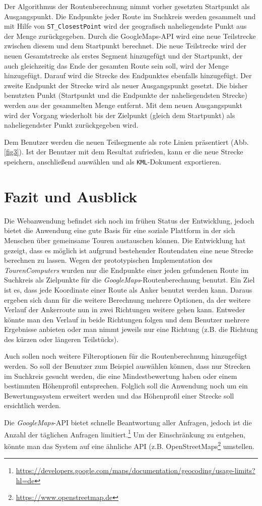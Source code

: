 \documentclass[a4paper,11pt,utf8]{scrartcl}
\begin{document}
Der Algorithmus der Routenberechnung nimmt vorher gesetzten Startpunkt als Ausgangspunkt. Die Endpunkte jeder Route im Suchkreis werden gesammelt und mit Hilfe von \texttt{ST\_ClosestPoint} wird der geografisch naheliegendste Punkt aus der Menge zurückgegeben. Durch die GoogleMaps-API wird eine neue Teilstrecke zwischen diesem und dem Startpunkt berechnet. Die neue Teilstrecke wird der neuen Gesamtstrecke als erstes Segment hinzugefügt und der Startpunkt, der auch gleichzeitig das Ende der gesamten Route sein soll, wird der Menge hinzugefügt. Darauf wird die Strecke des Endpunktes ebenfalls hinzugefügt. Der zweite Endpunkt der Strecke wird als neuer Ausgangspunkt gesetzt. Die bisher benutzten Punkt (Startpunkt und die Endpunkte der naheliegendsten Strecke) werden aus der gesammelten Menge entfernt. Mit dem neuen Ausgangspunkt wird der Vorgang wiederholt bis der Zielpunkt (gleich dem Startpunkt) als naheliegendster Punkt zurückgegeben wird.

Dem Benutzer werden die neuen Teilsegmente als rote Linien präsentiert (Abb. \ref{fig3}). Ist der Benutzer mit dem Resultat zufrieden, kann er die neue Strecke speichern, anschließend auswählen und als \texttt{KML}-Dokument exportieren.

\section{Fazit und Ausblick}
Die Webanwendung befindet sich noch im frühen Status der Entwicklung, jedoch bietet die Anwendung eine gute Basis für eine soziale Plattform in der sich Menschen über gemeinsame Touren austauschen können. Die Entwicklung hat gezeigt, dass es möglich ist aufgrund bestehender Routendaten eine neue Strecke berechnen zu lassen. Wegen der prototypischen Implementation des \textit{TourenComputers} wurden nur die Endpunkte einer jeden gefundenen Route im Suchkreis als Zielpunkte für die \textit{GoogleMaps}-Routenberechnung benutzt. Ein Ziel ist es, dass jede Koordinate einer Route als Anker benutzt werden kann. Daraus ergeben sich dann für die weitere Berechnung mehrere Optionen, da der weitere Verlauf der Ankerroute nun in zwei Richtungen weitere gehen kann. Entweder könnte man den Verlauf in beide Richtungen folgen und dem Benutzer mehrere Ergebnisse anbieten oder man nimmt jeweils nur eine Richtung (z.B. die Richtung des kürzen oder längeren Teilstücks).

Auch sollen noch weitere Filteroptionen für die Routenberechnung hinzugefügt werden. So soll der Benutzer zum Beispiel auswählen können, dass nur Strecken im Suchkreis gesucht werden, die eine Mindestbewertung haben oder einem bestimmten Höhenprofil entsprechen. Folglich soll die Anwendung noch um ein Bewertungssystem erweitert werden und das Höhenprofil einer Strecke soll ersichtlich werden.

Die \textit{GoogleMaps}-API bietet schnelle Beantwortung aller Anfragen, jedoch ist die Anzahl der täglichen Anfragen limitiert.\footnote{\url{https://developers.google.com/maps/documentation/geocoding/usage-limits?hl=de}} Um der Einschränkung zu entgehen, könnte man das System auf eine ähnliche API (z.B. OpenStreetMaps\footnote{\url{https://www.openstreetmap.de}} umstellen.
\end{document}

